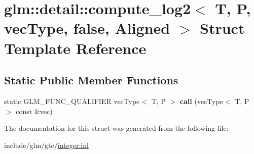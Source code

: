 \hypertarget{structglm_1_1detail_1_1compute__log2_3_01T_00_01P_00_01vecType_00_01false_00_01Aligned_01_4}{}\section{glm\+:\+:detail\+:\+:compute\+\_\+log2$<$ T, P, vec\+Type, false, Aligned $>$ Struct Template Reference}
\label{structglm_1_1detail_1_1compute__log2_3_01T_00_01P_00_01vecType_00_01false_00_01Aligned_01_4}
\subsection*{Static Public Member Functions}
\begin{DoxyCompactItemize}
\item 
\mbox{\label{structglm_1_1detail_1_1compute__log2_3_01T_00_01P_00_01vecType_00_01false_00_01Aligned_01_4_a207c0e9ebab0865aec294f9940bd9c64}} 
static G\+L\+M\+\_\+\+F\+U\+N\+C\+\_\+\+Q\+U\+A\+L\+I\+F\+I\+ER vec\+Type$<$ T, P $>$ {\bfseries call} (vec\+Type$<$ T, P $>$ const \&vec)
\end{DoxyCompactItemize}


The documentation for this struct was generated from the following file\+:\begin{DoxyCompactItemize}
\item 
include/glm/gtc/\hyperlink{gtc_2integer_8inl}{integer.\+inl}\end{DoxyCompactItemize}
